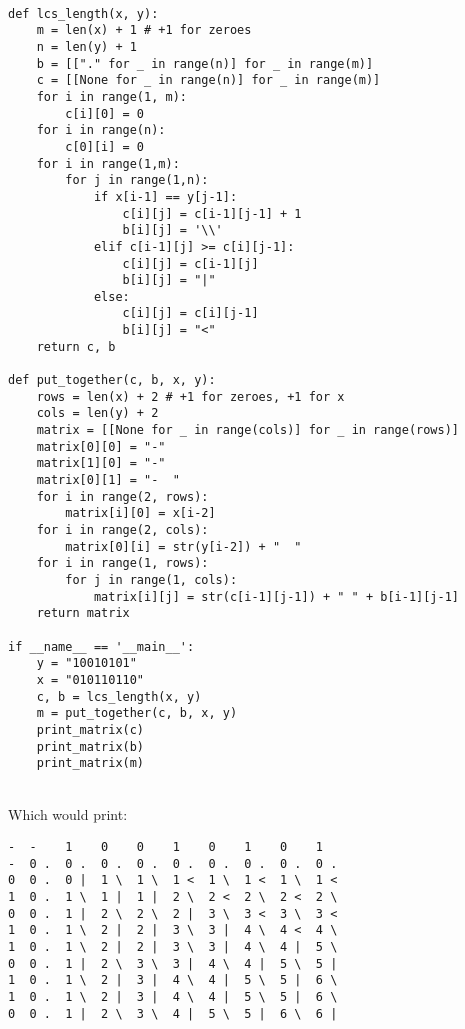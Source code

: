 \documentclass[11pt]{article}
\begin{document}
\begin{enumerate}
\begin{verbatim}
    
def lcs_length(x, y):
    m = len(x) + 1 # +1 for zeroes
    n = len(y) + 1
    b = [["." for _ in range(n)] for _ in range(m)]
    c = [[None for _ in range(n)] for _ in range(m)]
    for i in range(1, m):
        c[i][0] = 0
    for i in range(n):
        c[0][i] = 0
    for i in range(1,m):
        for j in range(1,n):
            if x[i-1] == y[j-1]:
                c[i][j] = c[i-1][j-1] + 1
                b[i][j] = '\\'
            elif c[i-1][j] >= c[i][j-1]:
                c[i][j] = c[i-1][j]
                b[i][j] = "|"
            else:
                c[i][j] = c[i][j-1]
                b[i][j] = "<"
    return c, b

def put_together(c, b, x, y):
    rows = len(x) + 2 # +1 for zeroes, +1 for x
    cols = len(y) + 2
    matrix = [[None for _ in range(cols)] for _ in range(rows)]
    matrix[0][0] = "-"
    matrix[1][0] = "-"
    matrix[0][1] = "-  "
    for i in range(2, rows):
        matrix[i][0] = x[i-2]
    for i in range(2, cols):
        matrix[0][i] = str(y[i-2]) + "  "
    for i in range(1, rows):
        for j in range(1, cols):
            matrix[i][j] = str(c[i-1][j-1]) + " " + b[i-1][j-1]
    return matrix

if __name__ == '__main__':
    y = "10010101"
    x = "010110110"
    c, b = lcs_length(x, y)
    m = put_together(c, b, x, y)
    print_matrix(c)
    print_matrix(b)
    print_matrix(m)
    \end{verbatim}
    \\ Which would print:
    \begin{verbatim}
-  -    1    0    0    1    0    1    0    1   
-  0 .  0 .  0 .  0 .  0 .  0 .  0 .  0 .  0 . 
0  0 .  0 |  1 \  1 \  1 <  1 \  1 <  1 \  1 < 
1  0 .  1 \  1 |  1 |  2 \  2 <  2 \  2 <  2 \ 
0  0 .  1 |  2 \  2 \  2 |  3 \  3 <  3 \  3 < 
1  0 .  1 \  2 |  2 |  3 \  3 |  4 \  4 <  4 \ 
1  0 .  1 \  2 |  2 |  3 \  3 |  4 \  4 |  5 \ 
0  0 .  1 |  2 \  3 \  3 |  4 \  4 |  5 \  5 | 
1  0 .  1 \  2 |  3 |  4 \  4 |  5 \  5 |  6 \ 
1  0 .  1 \  2 |  3 |  4 \  4 |  5 \  5 |  6 \ 
0  0 .  1 |  2 \  3 \  4 |  5 \  5 |  6 \  6 | 
    \end{verbatim}
    

\end{enumerate}
\end{document}
